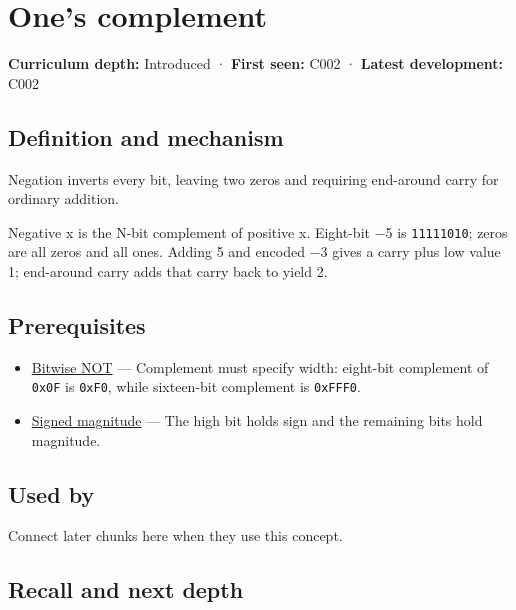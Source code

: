 \hypertarget{appendix-03c678cd40b3}{}
\section{One's complement}\label{appendix-03c678cd40b3-ones-complement}

\textbf{Curriculum depth:} Introduced · \textbf{First seen:} C002 · \textbf{Latest development:} C002

\subsection{Definition and mechanism}\label{appendix-03c678cd40b3-definition-and-mechanism}

Negation inverts every bit, leaving two zeros and requiring end-around carry for ordinary addition.

Negative x is the N-bit complement of positive x. Eight-bit −5 is \texttt{11111010}; zeros are all zeros and all ones. Adding 5 and encoded −3 gives a carry plus low value 1; end-around carry adds that carry back to yield 2.

\subsection{Prerequisites}\label{appendix-03c678cd40b3-prerequisites}

\begin{itemize}
\tightlist
\item
  \hyperref[appendix-8f38927cfc54]{Bitwise NOT} --- Complement must specify width: eight-bit complement of \texttt{0x0F} is \texttt{0xF0}, while sixteen-bit complement is \texttt{0xFFF0}.
\item
  \hyperref[appendix-ce20506c8532]{Signed magnitude} --- The high bit holds sign and the remaining bits hold magnitude.
\end{itemize}

\subsection{Used by}\label{appendix-03c678cd40b3-used-by}

Connect later chunks here when they use this concept.

\subsection{Recall and next depth}\label{appendix-03c678cd40b3-recall-and-next-depth}

